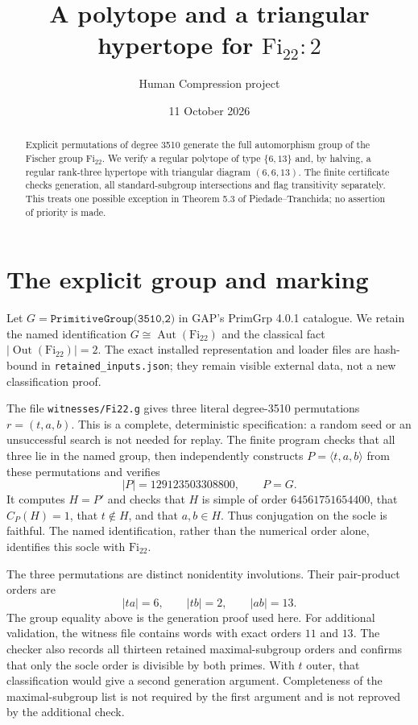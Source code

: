 \documentclass[11pt]{article}
\title{A polytope and a triangular hypertope for $\mathrm{Fi}_{22}:2$}
\author{Human Compression project}
\date{11 October 2026}
\begin{document}
\maketitle
\begin{abstract}
Explicit permutations of degree 3510 generate the full automorphism group of the Fischer group $\mathrm{Fi}_{22}$. We verify a regular polytope of type $\{6,13\}$ and, by halving, a regular rank-three hypertope with triangular diagram $(6,6,13)$. The finite certificate checks generation, all standard-subgroup intersections and flag transitivity separately. This treats one possible exception in Theorem 5.3 of Piedade--Tranchida; no assertion of priority is made.
\end{abstract}
\section{The explicit group and marking}
Let $G=\texttt{PrimitiveGroup(3510,2)}$ in GAP's PrimGrp 4.0.1 catalogue. We retain the named identification $G\cong\operatorname{Aut}(\mathrm{Fi}_{22})$ and the classical fact $|\operatorname{Out}(\mathrm{Fi}_{22})|=2$. The exact installed representation and loader files are hash-bound in \texttt{retained\_inputs.json}; they remain visible external data, not a new classification proof.

The file \texttt{witnesses/Fi22.g} gives three literal degree-3510 permutations $r=(t,a,b)$. This is a complete, deterministic specification: a random seed or an unsuccessful search is not needed for replay. The finite program checks that all three lie in the named group, then independently constructs $P=\langle t,a,b\rangle$ from these permutations and verifies
\[
 |P|=129123503308800,\qquad P=G.
\]
It computes $H=P'$ and checks that $H$ is simple of order $64561751654400$, that $C_P(H)=1$, that $t\notin H$, and that $a,b\in H$. Thus conjugation on the socle is faithful. The named identification, rather than the numerical order alone, identifies this socle with $\mathrm{Fi}_{22}$.

The three permutations are distinct nonidentity involutions. Their pair-product orders are
\begin{equation}\label{eq:orders}
 |ta|=6,\qquad |tb|=2,\qquad |ab|=13.
\end{equation}
The group equality above is the generation proof used here. For additional validation, the witness file contains words with exact orders $11$ and $13$. The checker also records all thirteen retained maximal-subgroup orders and confirms that only the socle order is divisible by both primes. With $t$ outer, that classification would give a second generation argument. Completeness of the maximal-subgroup list is not required by the first argument and is not reproved by the additional check.
\end{document}
